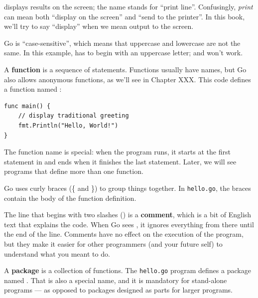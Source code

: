
 displays results on the screen; the name  stands for ``print line''.
Confusingly, {\em print} can mean both ``display on the screen'' and ``send to the printer''.
In this book, we'll try to say ``display'' when we mean output to the screen.


Go is ``case-sensitive'', which means that uppercase and lowercase are not the same.
In this example,  has to begin with an uppercase letter;  and  won't work.


A {\bf function} is a sequence of statements.
Functions usually have names, but Go also allows anonymous functions, as we'll see in Chapter XXX.
This code defines a function named :

\begin{lstlisting}
func main() {
	// display traditional greeting
	fmt.Println("Hello, World!")
}
\end{lstlisting}


The function name  is special: when the program runs,
it starts at the first statement in  and ends when it finishes the last statement.
Later, we will see programs that define more than one function.


Go uses curly braces (\{ and \}) to group things together.
In {\tt hello.go}, the braces contain the body of the function definition.


The line that begins with two slashes (\java{//}) is a {\bf comment}, which is a bit of English text that explains the code.
When Go sees \java{//}, it ignores everything from there until the end of the line.
Comments have no effect on the execution of the program, but they make it easier for other programmers (and your future self) to understand what you meant to do.



A {\bf package} is a collection of functions.
The {\tt hello.go} program defines a package named . That is also a special name, and it is mandatory for stand-alone programs
--- as opposed to packages designed as parts for larger programs. 

